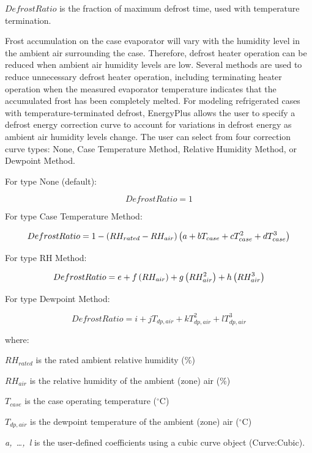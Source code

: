\(DefrostRatio\) is the fraction of maximum defrost time, used with temperature termination.

Frost accumulation on the case evaporator will vary with the humidity level in the ambient air surrounding the case. Therefore, defrost heater operation can be reduced when ambient air humidity levels are low. Several methods are used to reduce unnecessary defrost heater operation, including terminating heater operation when the measured evaporator temperature indicates that the accumulated frost has been completely melted. For modeling refrigerated cases with temperature-terminated defrost, EnergyPlus allows the user to specify a defrost energy correction curve to account for variations in defrost energy as ambient air humidity levels change. The user can select from four correction curve types: None, Case Temperature Method, Relative Humidity Method, or Dewpoint Method.

For type None (default):

\begin{equation}
  DefrostRatio = 1
\end{equation}

For type Case Temperature Method:

\begin{equation}
  DefrostRatio = 1 - \left(RH_{rated} - RH_{air}\right) \left(a + b T_{case} + c T_{case}^2 + d T_{case}^3\right)
\end{equation}

For type RH Method:

\begin{equation}
  DefrostRatio = e + f \left(RH_{air}\right) + g \left(RH_{air}^2\right) + h \left(RH_{air}^3\right)
\end{equation}

For type Dewpoint Method:

\begin{equation}
  DefrostRatio = i + j T_{dp,air} + k T_{dp,air}^2 + l T_{dp,air}^3
\end{equation}

where:

\(R{H_{rated}}\) is the rated ambient relative humidity (\%)

\(R{H_{air}}\) is the relative humidity of the ambient (zone) air (\%)

\({T_{case}}\) is the case operating temperature (\(^{\circ}\)C)

\({T_{dp,air}}\) is the dewpoint temperature of the ambient (zone) air (\(^{\circ}\)C)

\emph{a,~\ldots{},~l} is the user-defined coefficients using a cubic curve object (Curve:Cubic).

